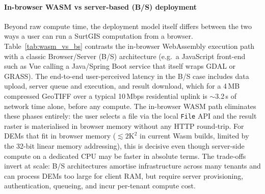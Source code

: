 \documentclass[preprint,review,12pt,authoryear]{elsarticle}
\begin{document}
\paragraph{In-browser WASM vs server-based (B/S) deployment} Beyond raw compute time, the deployment model itself differs between the two ways a user can run a SurtGIS computation from a browser. Table~\ref{tab:wasm_vs_bs} contrasts the in-browser WebAssembly execution path with a classic Browser/Server (B/S) architecture (e.g.\ a JavaScript front-end such as Vue calling a Java/Spring Boot service that itself wraps GDAL or GRASS). The end-to-end user-perceived latency in the B/S case includes data upload, server queue and execution, and result download, which for a 4\,MB compressed GeoTIFF over a typical 10\,Mbps residential uplink is $\sim$3.2\,s of network time alone, before any compute. The in-browser WASM path eliminates these phases entirely: the user selects a file via the local \texttt{File} API and the result raster is materialised in browser memory without any HTTP round-trip. For DEMs that fit in browser memory ($\lesssim 2\text{K}^2$ in current Wasm builds, limited by the 32-bit linear memory addressing), this is decisive even though server-side compute on a dedicated CPU may be faster in absolute terms. The trade-offs invert at scale: B/S architectures amortise infrastructure across many tenants and can process DEMs too large for client RAM, but require server provisioning, authentication, queueing, and incur per-tenant compute cost.
\end{document}
